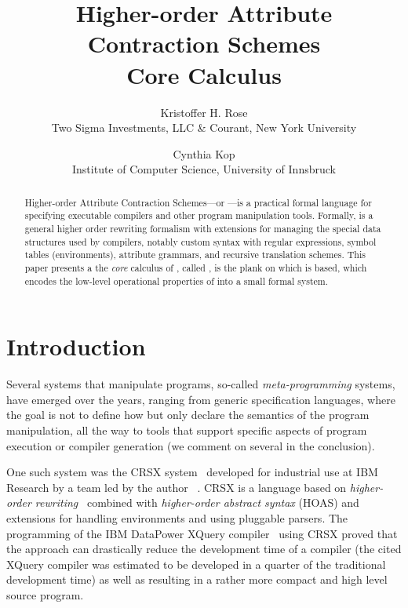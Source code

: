 \documentclass[letterpaper,11pt]{article}
\title{ Higher-order Attribute Contraction Schemes \\ Core Calculus }
\author{ Kristoffer H. Rose \\
 Two Sigma Investments, LLC \& Courant, New York University
 \and
 Cynthia Kop \\
 Institute of Computer Science, University of Innsbruck \\
}
\begin{document}
\maketitle

\begin{abstract}\noindent
  Higher-order Attribute Contraction Schemes---or \HAX---is a practical formal language for
  specifying executable compilers and other program manipulation tools.
  Formally, \HAX is a general higher order rewriting formalism with extensions for managing the
  special data structures used by compilers, notably custom syntax with regular expressions, symbol
  tables (\aka environments), attribute grammars, and recursive translation schemes.
  This paper presents a the \emph{core} calculus of \HAX, called \hax, is the plank on which \HAX is
  based, which encodes the low-level operational properties of \HAX into a small formal system.
\end{abstract}


\section{Introduction}\label{sec:intro}

Several systems that manipulate programs, so-called \emph{meta-programming} systems, have emerged
over the years, ranging from generic specification languages, where the goal is not to define how
but only declare the semantics of the program manipulation, all the way to tools that support
specific aspects of program execution or compiler generation (we comment on several in the
conclusion).

One such system was the CRSX system~\cite{Rose:1996} developed for industrial use at IBM Research by
a team led by the author~\cite{Rose:hor2010,Rose:rta2011,crsx} .  CRSX is a language based on
\emph{higher-order rewriting}~\cite{Jouannaud:klop2005} combined with \emph{higher-order abstract
  syntax} (HOAS) \cite{PfenningElliot:pldi1988} and extensions for handling environments and using
pluggable parsers.  The programming of the IBM Data\-Power XQuery compiler~\cite{dp60:ibm2013} using
CRSX proved that the approach can drastically reduce the development time of a compiler (the cited
XQuery compiler was estimated to be developed in a quarter of the traditional development time) as
well as resulting in a rather more compact and high level source program.
\end{document}
